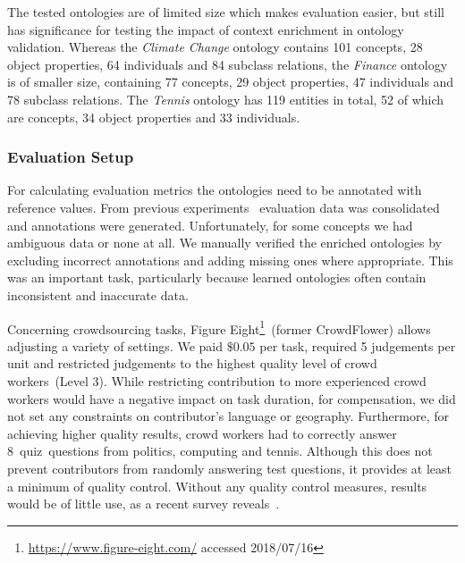 \documentclass[draft,final]{vutinfth} %
\begin{document}
The tested ontologies are of limited size which makes evaluation easier, but still has significance for testing the impact of context enrichment in ontology validation. Whereas the \emph{Climate Change} ontology contains 101 concepts, 28 object properties, 64 individuals and 84 subclass relations, the \emph{Finance} ontology is of smaller size, containing 77 concepts, 29 object properties, 47 individuals and 78 subclass relations. The \emph{Tennis} ontology has 119 entities in total, 52 of which are concepts, 34 object properties and 33 individuals. 

\subsubsection{Evaluation Setup}
For calculating evaluation metrics the ontologies need to be annotated with reference values. From previous experiments~\cite{wohlgenannt2016} evaluation data was consolidated and annotations were generated. Unfortunately, for some concepts we had ambiguous data or none at all. We manually verified the enriched ontologies by excluding incorrect annotations and adding missing ones where appropriate. This was an important task, particularly because learned ontologies often contain inconsistent and inaccurate data. 

Concerning crowdsourcing tasks, Figure Eight\footnote{\url{https://www.figure-eight.com/} accessed 2018/07/16}~(former CrowdFlower) allows adjusting a variety of settings. We paid $\$0.05$ per task, required 5 judgements per unit and restricted judgements to the highest quality level of crowd workers~(Level 3). While restricting contribution to more experienced crowd workers would have a negative impact on task duration, for compensation, we did not set any constraints on contributor's language or geography. Furthermore, for achieving higher quality results, crowd workers had to correctly answer 8~quiz~questions from politics, computing and tennis. Although this does not prevent contributors from randomly answering test questions, it provides at least a minimum of quality control. Without any quality control measures, results would be of little use, as a recent survey reveals~\cite{daniel2018}. 
\end{document}
